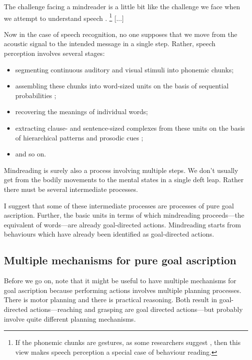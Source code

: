 \documentclass[12pt,\papersize]{extarticle}
\begin{document}
The challenge facing a mindreader is a little bit like the challenge we face when we attempt to understand speech \citep{Baird:2001mb,Baldwin:2001rs}.%
\footnote{
	If the phonemic chunks are gestures, as some researchers suggest \citep[]{Browman:1992da, Liberman:2000gr}, then this view makes speech perception a special case of behaviour reading.}
[...]

Now in the case of speech recognition, no one supposes that we move from the acoustic signal to the intended message in a single step.
Rather, speech perception involves several stages: 
\begin{itemize}
\item 
segmenting continuous auditory and visual stimuli into phonemic chunks; 
\item 
assembling these chunks into word-sized units on the basis of sequential probabilities \citep[]{Saffran:1996aj}; 
\item 
recovering the meanings of individual words;
\item
 extracting clause- and sentence-sized complexes from these units on the basis of hierarchical patterns and prosodic cues \citep[]{Newport:2004wi, Soderstrom:2005zy}; 
\item
and so on.
\end{itemize}


Mindreading is surely also a process involving multiple steps.
We don't usually get from the bodily movements to the mental states in a single deft leap.
Rather there must be several intermediate processes.

I suggest that some of these intermediate processes are processes of pure goal ascription. 
Further, the basic units in terms of which mindreading proceeds---the equivalent of words---are already goal-directed actions.
Mindreading starts from behaviours which have already been identified as goal-directed actions.


\subsection{Multiple mechanisms for pure goal ascription}
Before we go on, note that it might be useful to have multiple mechanisms for goal ascription because performing actions involves multiple planning processes.
There is motor planning and there is practical reasoning.
Both result in goal-directed actions---reaching and grasping are goal directed actions---but probably involve quite different planning mechanisms.
\end{document}
